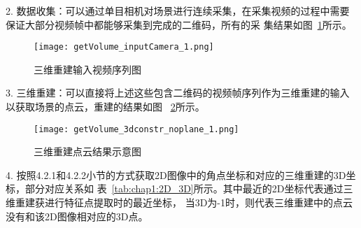 2.	数据收集：可以通过单目相机对场景进行连续采集，在采集视频的过程中需要保证大部分视频帧中都能够采集到完成的二维码，所有的采
集结果如图~\ref{fig:getVolume_inputCamera}所示。

\begin{figure}[H] %
  \centering
  \texttt{[image: getVolume\_inputCamera\_1.png]}
  \caption{三维重建输入视频序列图}
  \label{fig:getVolume_inputCamera}
  \end{figure}

3.	三维重建：可以直接将上述这些包含二维码的视频帧序列作为三维重建的输入以获取场景的点云，重建的结果如图
~\ref{fig:getVolume_3dconstr_noplane}所示。
\begin{figure}[H] %
  \centering
  \texttt{[image: getVolume\_3dconstr\_noplane\_1.png]}
  \caption{三维重建点云结果示意图}
  \label{fig:getVolume_3dconstr_noplane}
  \end{figure}

4.	按照4.2.1和4.2.2小节的方式获取2D图像中的角点坐标和对应的三维重建的3D坐标，部分对应关系如
表~\ref{tab:chap1:2D_3D}所示。其中最近的2D坐标代表通过三维重建获进行特征点提取时的最近坐标，
当3D为-1时，则代表三维重建中的点云没有和该2D图像相对应的3D点。

